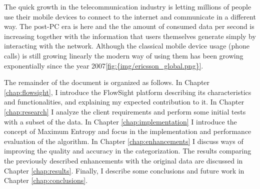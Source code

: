 
The quick growth in the telecommunication industry is letting millions of people use their mobile devices to connect to the internet and communicate in a different way. The post-PC era is here and the 
the amount of consumed data per second is increasing together with the information that users themselves generate simply by interacting with the network.
Although the classical mobile device usage (phone calls) is still growing linearly the modern way of using them has been growing exponentially since the year 2007\ref{fig:{img/ericsson_global.png}}.




The remainder of the document is organized as follows. In Chapter \ref{chap:flowsight}, I introduce the FlowSight platform describing its characteristics and functionalities, and explaining my
expected contribution to it. In Chapter \ref{chap:research} I analyze the client requirements and perform some initial tests with a subset of the data. In Chapter \ref{chap:implementation} I introduce
the concept of Maximum Entropy and focus in the implementation and performance evaluation of the algorithm. In Chapter \ref{chap:enhancements} I discuss ways of improving the quality and accuracy
in the categorization. The results comparing the previously described enhancements with the original data are discussed in Chapter \ref{chap:results}. Finally, I describe some conclusions and future 
work in Chapter \ref{chap:conclusions}.
